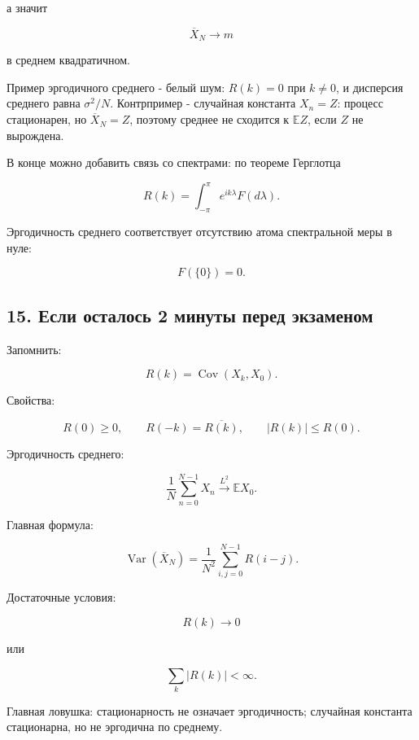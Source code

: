 \documentclass[
  11pt,
  a4paper,
]{article}
\begin{document}
а значит

\[
\overline X_N\to m
\]

в среднем квадратичном.

Пример эргодичного среднего - белый шум: \(R(k)=0\) при \(k\ne0\), и
дисперсия среднего равна \(\sigma^2/N\). Контрпример - случайная
константа \(X_n=Z\): процесс стационарен, но \(\overline X_N=Z\),
поэтому среднее не сходится к \(\mathbb EZ\), если \(Z\) не вырождена.

В конце можно добавить связь со спектрами: по теореме Герглотца

\[
R(k)=\int_{-\pi}^{\pi}e^{ik\lambda}F(d\lambda).
\]

Эргодичность среднего соответствует отсутствию атома спектральной меры в
нуле:

\[
F(\{0\})=0.
\]

\subsection{15. Если осталось 2 минуты перед
экзаменом}\label{ux435ux441ux43bux438-ux43eux441ux442ux430ux43bux43eux441ux44c-2-ux43cux438ux43dux443ux442ux44b-ux43fux435ux440ux435ux434-ux44dux43aux437ux430ux43cux435ux43dux43eux43c}

Запомнить:

\[
R(k)=\operatorname{Cov}(X_k,X_0).
\]

Свойства:

\[
R(0)\ge0,
\qquad
R(-k)=\overline{R(k)},
\qquad
|R(k)|\le R(0).
\]

Эргодичность среднего:

\[
\frac1N\sum_{n=0}^{N-1}X_n
\xrightarrow{L^2}
\mathbb EX_0.
\]

Главная формула:

\[
\operatorname{Var}(\overline X_N)
=
\frac1{N^2}\sum_{i,j=0}^{N-1}R(i-j).
\]

Достаточные условия:

\[
R(k)\to0
\]

или

\[
\sum_k|R(k)|<\infty.
\]

Главная ловушка: стационарность не означает эргодичность; случайная
константа стационарна, но не эргодична по среднему.

\newpage
\end{document}
